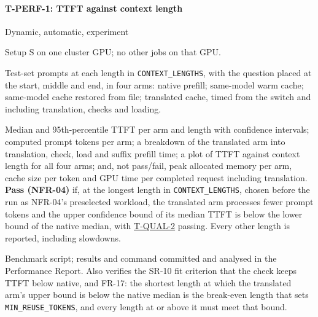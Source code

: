 \documentclass[12pt, titlepage]{article}
\newenvironment{testcase}[2]
  {\Needspace{8\baselineskip}\paragraph{#1: #2}\phantomsection\label{test:#1}\sloppy
   \begin{description}[style=sameline, leftmargin=3.6cm, labelwidth=3.4cm,
     font=\normalfont\bfseries, itemsep=2pt, topsep=2pt]}
  {\end{description}}
\newcommand{\cst}[1]{\texttt{#1}}
\newcommand{\tref}[1]{\hyperref[test:#1]{#1}}
\begin{document}
\begin{testcase}{T-PERF-1}{TTFT against context length}
\item[Type] Dynamic, automatic, experiment
\item[Initial state] Setup S on one cluster GPU; no other jobs on that GPU.
\item[Input/Condition] Test-set prompts at each length in
\cst{CONTEXT\_LENGTHS}, with the question placed at the start, middle and
end, in four arms: native prefill; same-model warm cache; same-model cache
restored from file; translated cache, timed from the switch and including
translation, checks and loading.
\item[Output/Result] Median and 95th-percentile TTFT per arm and length
with confidence intervals; computed prompt tokens per arm; a breakdown of
the translated arm into translation, check, load and suffix prefill time;
a plot of TTFT against context length for all four arms; and, not
pass/fail, peak allocated memory per arm, cache size per token and GPU time
per completed request including translation. \textbf{Pass
(NFR-04)} if, at the longest length in \cst{CONTEXT\_LENGTHS}, chosen
before the run as NFR-04's preselected workload, the translated arm processes fewer prompt
tokens and the upper confidence bound of its median TTFT is below the lower
bound of the native median, with \tref{T-QUAL-2} passing. Every other
length is reported, including slowdowns.
\item[How performed] Benchmark script; results and command committed and
analysed in the Performance Report. Also verifies the SR-10 fit criterion
that the check keeps TTFT below native, and FR-17: the shortest length at
which the translated arm's upper bound is below the native median is the
break-even length that sets \cst{MIN\_REUSE\_TOKENS}, and every length at or
above it must meet that bound.
\end{testcase}
\end{document}
